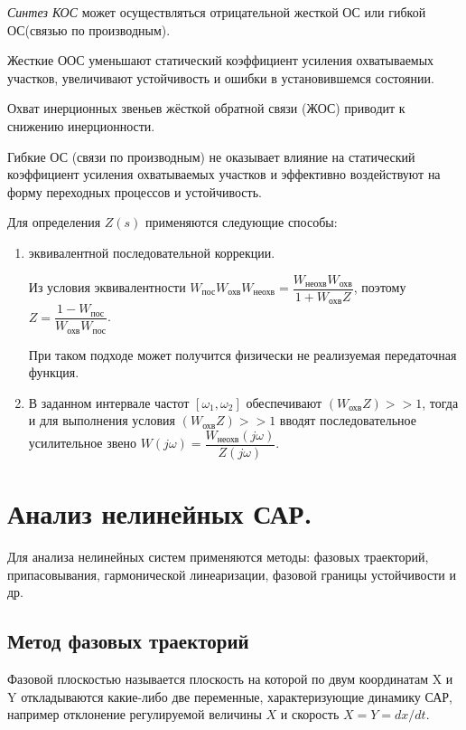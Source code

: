 \documentclass[unicode, 12pt, a4paper, oneside]{article}
\begin{document}
\textit{Синтез КОС} может осуществляться отрицательной жесткой ОС или гибкой ОС(связью по производным).

Жесткие ООС уменьшают статический коэффициент усиления охватываемых участков, увеличивают устойчивость и ошибки в установившемся состоянии.

Охват инерционных звеньев жёсткой обратной связи (ЖОС) приводит к снижению инерционности.

Гибкие ОС (связи по производным) не оказывает влияние на статический коэффициент усиления охватываемых участков и эффективно воздействуют на форму переходных процессов и устойчивость.

Для определения $ Z(s) $ применяются следующие способы: 
\begin{enumerate}
\item эквивалентной последовательной коррекции.
\par Из условия эквивалентности
$ W_\text{пос} W_\text{охв} W_\text{неохв}  = \dfrac{W_\text{неохв} W_\text{охв}}{1 + W_\text{охв} Z} $, поэтому 
$ Z = \dfrac{1 - W_\text{пос}}{W_\text{охв} W_\text{пос}} $.
\par При таком подходе может получится физически не реализуемая передаточная функция.
\item В заданном интервале частот $ [\omega_1, \omega_2] $ обеспечивают $ ( W_\text{охв} Z ) >> 1 $, тогда  и для выполнения условия  $ (W_\text{охв} Z)  >> 1 $ вводят последовательное усилительное звено $ W(j\omega) = \dfrac{W_\text{неохв}(j\omega)}{Z(j\omega)} $.
\end{enumerate}


\section{Анализ нелинейных САР.}

Для анализа нелинейных систем применяются методы: фазовых траекторий, припасовывания, гармонической линеаризации, фазовой границы устойчивости и др.

\subsection*{Метод фазовых траекторий}

Фазовой плоскостью называется плоскость на которой по двум координатам X и Y откладываются какие-либо две переменные, характеризующие динамику САР, например отклонение регулируемой величины $ X $ и скорость $ X = Y = dx/dt $.
\end{document}
